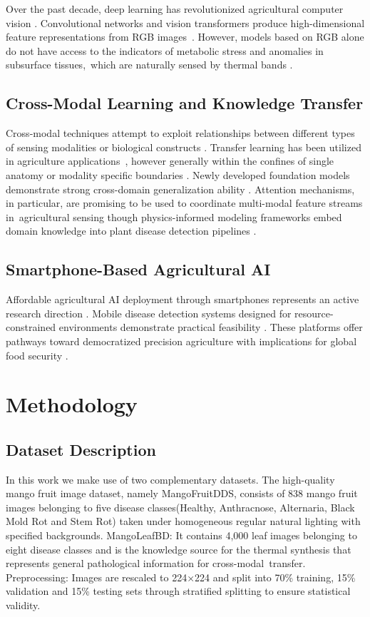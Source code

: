 \documentclass[utf8]{FrontiersinHarvard} %
\begin{document}
Over the past decade, deep learning has revolutionized agricultural computer vision \cite{kamilaris2018}. Convolutional networks and vision transformers produce high-dimensional feature representations from RGB images \cite{dosovitskiy2021}. However, models based on RGB alone do not have access to the indicators of metabolic stress and anomalies in subsurface tissues, which are naturally sensed by thermal bands \cite{lu2020}. 
\subsection{Cross-Modal Learning and Knowledge Transfer}

Cross-modal techniques attempt to exploit relationships between different types of sensing modalities or biological constructs \cite{zhuang2020}. Transfer learning has been utilized in agriculture applications \cite{chen2020_transfer,tan2018}, however generally within the confines of single anatomy or modality specific boundaries \cite{barbedo2019}.
Newly developed foundation models demonstrate strong cross-domain generalization ability \cite{vaswani2017}. Attention mechanisms, in particular, are promising to be used to coordinate multi-modal feature streams in agricultural sensing \cite{niu2021} though physics-informed modeling frameworks embed domain knowledge into plant disease detection pipelines \cite{karniadakis2021}. 

\subsection{Smartphone-Based Agricultural AI}

Affordable agricultural AI deployment through smartphones represents an active research direction \cite{pongnumkul2015}. Mobile disease detection systems designed for resource-constrained environments demonstrate practical feasibility \cite{li2020}. These platforms offer pathways toward democratized precision agriculture with implications for global food security \cite{liu2020_yolo}.

\section{Methodology}

\subsection{Dataset Description}
In this work we make use of two complementary datasets. The high-quality mango fruit image dataset, namely MangoFruitDDS, consists of 838 mango fruit images belonging to five disease classes(Healthy, Anthracnose, Alternaria, Black Mold Rot and Stem Rot) taken under homogeneous regular natural lighting with speciﬁed backgrounds. MangoLeafBD: It contains 4,000 leaf images belonging to eight disease classes and is the knowledge source for the thermal synthesis that represents general pathological information for cross-modal transfer.
Preprocessing: Images are rescaled to 224×224 and split into 70\% training, 15\% validation and 15\% testing sets through stratified splitting to ensure statistical validity. 
\end{document}
